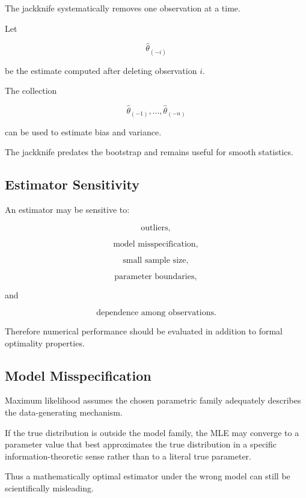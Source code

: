 The jackknife systematically removes one observation at a time.

Let

\[
\widehat{\theta}_{(-i)}
\]

be the estimate computed after deleting observation \(i\).

The collection

\[
\widehat{\theta}_{(-1)},
\ldots,
\widehat{\theta}_{(-n)}
\]

can be used to estimate bias and variance.

The jackknife predates the bootstrap and remains useful for smooth
statistics.

\subsection{Estimator Sensitivity}
\label{subsec:estimator-sensitivity}

An estimator may be sensitive to:

\[
\boxed{
\text{outliers},
}
\]

\[
\boxed{
\text{model misspecification},
}
\]

\[
\boxed{
\text{small sample size},
}
\]

\[
\boxed{
\text{parameter boundaries},
}
\]

and

\[
\boxed{
\text{dependence among observations}.
}
\]

Therefore numerical performance should be evaluated in addition to
formal optimality properties.

\subsection{Model Misspecification}
\label{subsec:model-misspecification-estimation}

Maximum likelihood assumes the chosen parametric family adequately
describes the data-generating mechanism.

If the true distribution is outside the model family, the MLE may
converge to a parameter value that best approximates the true
distribution in a specific information-theoretic sense rather than to a
literal true parameter.

Thus a mathematically optimal estimator under the wrong model can still
be scientifically misleading.

